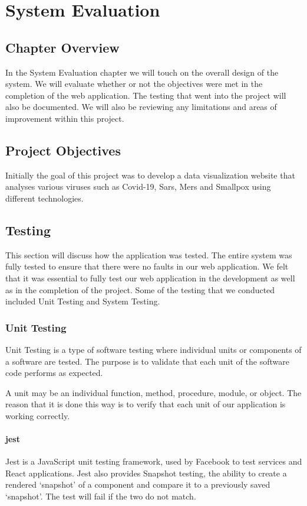 \chapter{System Evaluation}

\section{Chapter Overview}
In the System Evaluation chapter we will touch on the overall design of the system.
We will evaluate whether or not the objectives were met in the completion of the web application.
The testing that went into the project will also be documented.
We will also be reviewing any limitations and areas of improvement within this project.

\section{Project Objectives}
Initially the goal of this project was to develop a data visualization website that analyses various viruses such as Covid-19, Sars, Mers and Smallpox using different technologies.

\section{Testing}
This section will discuss how the application was tested.
The entire system was fully tested to ensure that there were no faults in our web application.
We felt that it was essential to fully test our web application in the development as well as in the completion of the project.
Some of the testing that we conducted included Unit Testing and System Testing.


\subsection{Unit Testing}
Unit Testing is a type of software testing where individual units or components of a software are tested. 
The purpose is to validate that each unit of the software code performs as expected.

A unit may be an individual function, method, procedure, module, or object.
The reason that it is done this way is to verify that each unit of our application is working correctly.


\subsubsection{jest}
Jest is a JavaScript unit testing framework, used by Facebook to test services and React applications.
Jest also provides Snapshot testing, the ability to create a rendered ‘snapshot’ of a component and compare it to a previously saved ‘snapshot’. The test will fail if the two do not match.

